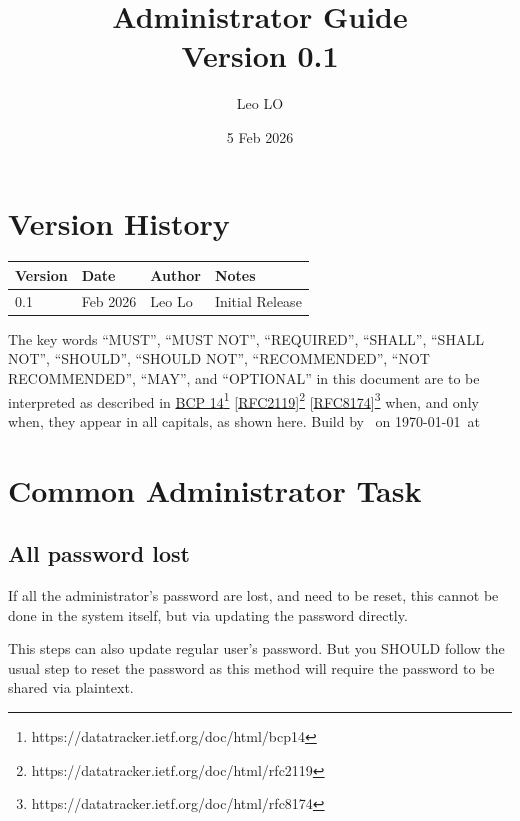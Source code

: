 \documentclass[12pt]{report}
\title{Administrator Guide\\Version 0.1}
\author{Leo LO}
\date{5 Feb 2026}
\begin{document}
    \maketitle
    \chapter*{Version History}
    \begin{tabular}{|l|l|l|p{10cm}|}
        \hline
        Version & Date & Author & Notes \\\hline
        0.1 & Feb 2026 & Leo Lo & Initial Release \\\hline
    \end{tabular}
    \tableofcontents

    \pagebreak
    \hspace{0pt}
    \vfill
    The key words ``MUST'', ``MUST NOT'', ``REQUIRED'', ``SHALL'', ``SHALL NOT'', ``SHOULD'', ``SHOULD NOT'',
    ``RECOMMENDED'', ``NOT RECOMMENDED'', ``MAY'', and ``OPTIONAL'' in this document are to be interpreted as described
    in \href{https://datatracker.ietf.org/doc/html/bcp14}{BCP 14}\footnote{https://datatracker.ietf.org/doc/html/bcp14}
    [\href{https://datatracker.ietf.org/doc/html/rfc2119}{RFC2119}]\footnote{https://datatracker.ietf.org/doc/html/rfc2119}
    [\href{https://datatracker.ietf.org/doc/html/rfc8174}{RFC8174}]\footnote{https://datatracker.ietf.org/doc/html/rfc8174}
    when, and only when, they appear in all capitals, as shown here.
    \vfill
    \hspace{0pt}
    Build by \texenginefull\ on \today\ at \currenttime
    \vfill
    \hspace{0pt}
    \pagebreak
    \chapter{Common Administrator Task}\label{ch:common-tasks}
    \section{All password lost}\label{sec:all-password-lost}
    If all the administrator's password are lost, and need to be reset, this cannot be done in the system itself, but
    via updating the password directly.

    \begin{infobox}
        This steps can also update regular user's password.
        But you SHOULD follow the usual step to reset the password as this method will require the password to be
        shared via plaintext.
    \end{infobox}
\end{document}
